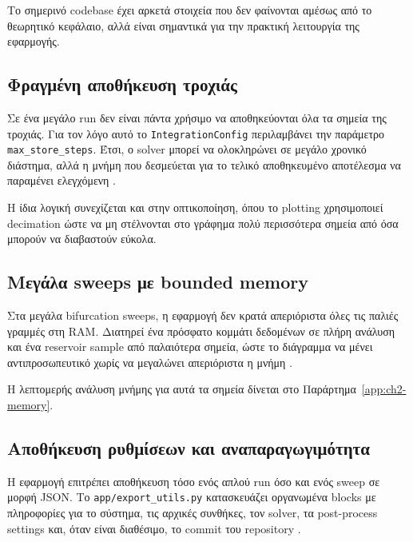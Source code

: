 Το σημερινό codebase έχει αρκετά στοιχεία που δεν φαίνονται αμέσως από το
θεωρητικό κεφάλαιο, αλλά είναι σημαντικά για την πρακτική λειτουργία της
εφαρμογής.

\subsection{Φραγμένη αποθήκευση τροχιάς}
\label{subsec:ch2-bounded-trajectory}

Σε ένα μεγάλο run δεν είναι πάντα χρήσιμο να αποθηκεύονται όλα τα σημεία της
τροχιάς. Για τον λόγο αυτό το \texttt{IntegrationConfig} περιλαμβάνει την
παράμετρο \texttt{max\_store\_steps}. Έτσι, ο solver μπορεί να ολοκληρώνει σε
μεγάλο χρονικό διάστημα, αλλά η μνήμη που δεσμεύεται για το τελικό αποθηκευμένο
αποτέλεσμα να παραμένει ελεγχόμενη
\cite{nlds_src_app_params,nlds_src_app_cache,nlds_src_core_solver,nlds_src_core_symplectic}.

Η ίδια λογική συνεχίζεται και στην οπτικοποίηση, όπου το plotting
χρησιμοποιεί decimation ώστε να μη στέλνονται στο γράφημα πολύ περισσότερα
σημεία από όσα μπορούν να διαβαστούν εύκολα.

\subsection{Μεγάλα sweeps με bounded memory}
\label{subsec:ch2-bounded-sweeps}

Στα μεγάλα bifurcation sweeps, η εφαρμογή δεν κρατά απεριόριστα όλες τις
παλιές γραμμές στη RAM. Διατηρεί ένα πρόσφατο κομμάτι δεδομένων σε πλήρη
ανάλυση και ένα reservoir sample από παλαιότερα σημεία, ώστε το διάγραμμα να
μένει αντιπροσωπευτικό χωρίς να μεγαλώνει απεριόριστα η μνήμη
\cite{nlds_src_ui_bifurcation_tab,nlds_src_logic_reservoir}.

Η λεπτομερής ανάλυση μνήμης για αυτά τα σημεία δίνεται στο
Παράρτημα~\ref{app:ch2-memory}.

\subsection{Αποθήκευση ρυθμίσεων και αναπαραγωγιμότητα}
\label{subsec:ch2-reproducibility}

Η εφαρμογή επιτρέπει αποθήκευση τόσο ενός απλού run όσο και ενός sweep σε
μορφή JSON. Το \texttt{app/export\_utils.py} κατασκευάζει οργανωμένα blocks με
πληροφορίες για το σύστημα, τις αρχικές συνθήκες, τον solver, τα post-process
settings και, όταν είναι διαθέσιμο, το commit του repository
\cite{nlds_src_app_export}.

